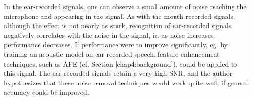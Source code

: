 % 

In the ear-recorded signals, one can observe a small amount of noise reaching the microphone and appearing in the signal.  As with the mouth-recorded signals, although the effect is not nearly as stark, recognition of ear-recorded signals negatively correlates with the noise in the signal, ie. as noise increases, performance decreases.   If performance were to improve significantly, eg. by training an acoustic model on ear-recorded speech, feature enhancement techniques, such as AFE (cf. Section \ref{chap4:background}), could be applied to this signal.  The ear-recorded signals retain a very high SNR, and the author hypothesizes that these noise removal techniques would work quite well, if general accuracy could be improved.


